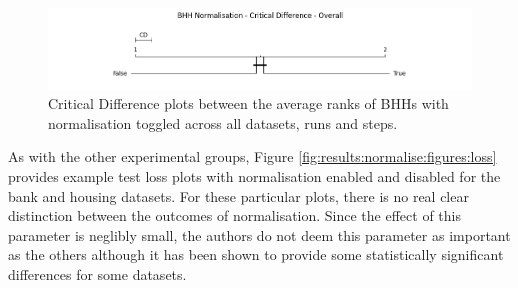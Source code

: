 \begin{figure}[htbp]
	\centering
	\includegraphics[width=\textwidth]{analysis/bhh_normalise/figures/cd/overall.png}
	\caption{Critical Difference plots between the average ranks of \Acsp{BHH} with normalisation toggled across all datasets, runs and steps.}
	\label{fig:results:normalise:descriptive:cd}
\end{figure}

As with the other experimental groups, Figure \ref{fig:results:normalise:figures:loss} provides example test loss plots with normalisation enabled and disabled for the bank and housing datasets. For these particular plots, there is no real clear distinction between the outcomes of normalisation. Since the effect of this parameter is neglibly small, the authors do not deem this parameter as important as the others although it has been shown to provide some statistically significant differences for some datasets.


